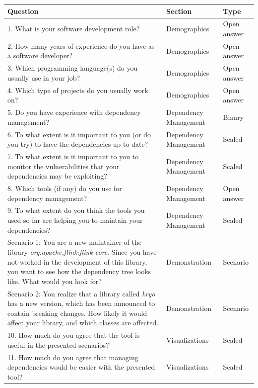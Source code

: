 \begin{table}[p]
    \begin{center}
    \begin{tabularx}{\textwidth}{|X|l|l|}
    \hline
    Question & Section & Type \\\hline
    \hline
    1.  What is your software development role?  & Demographics & Open answer \\\hline
    2.	How many years of experience do you have as a software developer? & Demographics & Open answer \\\hline
    3.	Which programming language(s) do you usually use in your job? & Demographics & Open answer \\\hline
    4.	Which type of projects do you usually work on? & Demographics & Open answer \\\hline
    \hline
    5.	Do you have experience with dependency management? & Dependency Management & Binary \\\hline
    6.	To what extent is it important to you (or do you try) to have the dependencies up to date? & Dependency Management & Scaled \\\hline
    7.	To what extent is it important to you to monitor the vulnerabilities that your dependencies may be exploiting? & Dependency Management & Scaled \\\hline
    8.	Which tools (if any) do you use for dependency management? & Dependency Management & Open answer \\\hline
    9.	To what extent do you think the tools you used so far are helping you to maintain your dependencies? & Dependency Management & Scaled \\\hline
    \hline
    Scenario 1: You are a new maintainer of the library \textit{org.apache.flink:flink-core}. Since you have not worked in the development of this library, you want to see how the dependency tree looks like. What would you look for? & Demonstration & Scenario \\\hline
    Scenario 2: You realize that a library called \textit{kryo} has a new version, which has been announced to contain breaking changes. How likely it would affect your library, and which classes are affected. & Demonstration & Scenario \\\hline
    \hline
    10.	How much do you agree that the tool is useful in the presented scenarios? & Visualizations & Scaled \\\hline
    11.	How much do you agree that managing dependencies would be easier with the presented tool? & Visualizations & Scaled \\\hline

\end{tabularx}
\end{center}
\end{table}
